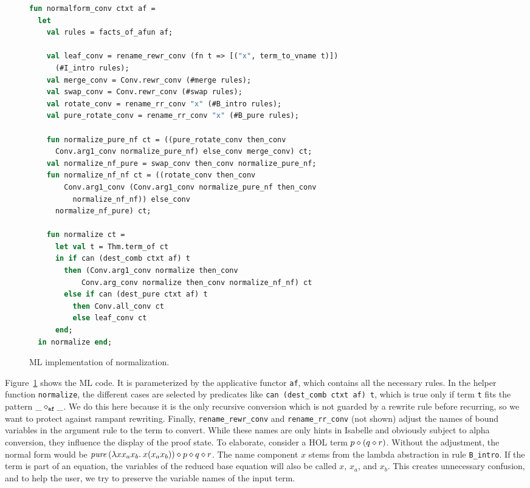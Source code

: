 \begin{figure}
\begin{lstlisting}[language=ml]
fun normalform_conv ctxt af =
  let
    val rules = facts_of_afun af;

    val leaf_conv = rename_rewr_conv (fn t => [("x", term_to_vname t)])
      (#I_intro rules);
    val merge_conv = Conv.rewr_conv (#merge rules);
    val swap_conv = Conv.rewr_conv (#swap rules);
    val rotate_conv = rename_rr_conv "x" (#B_intro rules);
    val pure_rotate_conv = rename_rr_conv "x" (#B_pure rules);

    fun normalize_pure_nf ct = ((pure_rotate_conv then_conv
      Conv.arg1_conv normalize_pure_nf) else_conv merge_conv) ct;
    val normalize_nf_pure = swap_conv then_conv normalize_pure_nf;
    fun normalize_nf_nf ct = ((rotate_conv then_conv
        Conv.arg1_conv (Conv.arg1_conv normalize_pure_nf then_conv
          normalize_nf_nf)) else_conv
      normalize_nf_pure) ct;

    fun normalize ct =
      let val t = Thm.term_of ct
      in if can (dest_comb ctxt af) t
        then (Conv.arg1_conv normalize then_conv
            Conv.arg_conv normalize then_conv normalize_nf_nf) ct
        else if can (dest_pure ctxt af) t
          then Conv.all_conv ct
          else leaf_conv ct
      end;
  in normalize end;
\end{lstlisting}
\caption{ML implementation of normalization.}
\label{fig:ml-normalform}
\end{figure}

Figure~\ref{fig:ml-normalform} shows the ML code.
It is parameterized by the applicative functor \verb+af+, which contains all
the necessary rules.
In the helper function \verb+normalize+, the different cases are selected
by predicates like \verb+can (dest_comb ctxt af) t+, which is true only if
term \verb+t+ fits the pattern $\_ \diamond_\mathtt{af} \_$.
We do this here because it is the only recursive conversion which is not
guarded by a rewrite rule before recurring, so we want to protect against
rampant rewriting.
Finally, \verb+rename_rewr_conv+ and \verb+rename_rr_conv+ (not shown)
adjust the names of bound variables in the argument rule to the term to convert.
While these names are only hints in Isabelle and obviously subject to alpha
conversion, they influence the display of the proof state.
To elaborate, consider a HOL term $p \diamond (q \diamond r)$.
Without the adjustment, the normal form would be
$\operatorname{\mathit{pure}}{(\lambda xx_ax_b.\>x(x_ax_b))} \diamond p \diamond q \diamond r$.
The name component $x$ stems from the lambda abstraction in rule \verb+B_intro+.
If the term is part of an equation, the variables of the reduced base equation
will also be called $x$, $x_a$, and $x_b$.
This creates unnecessary confusion, and to help the user, we try to preserve the
variable names of the input term.
